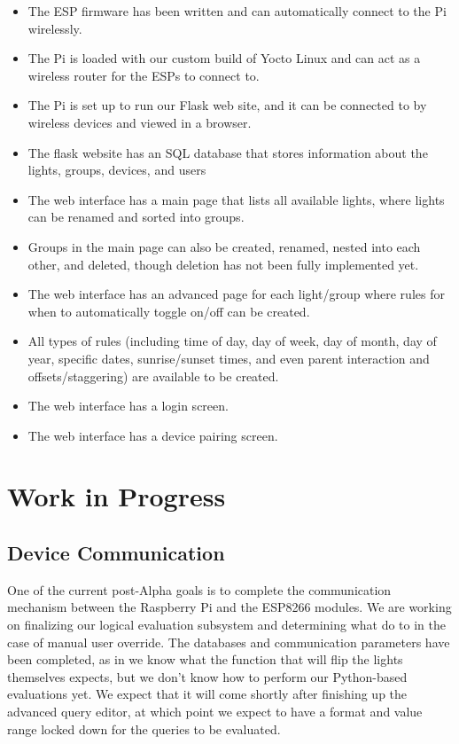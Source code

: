 \documentclass[oneside,openright]{book}
\begin{document}
\begin{itemize}
    \item The ESP firmware has been written and can automatically connect to
        the Pi wirelessly.
    \item The Pi is loaded with our custom build of Yocto Linux and can act as
        a wireless router for the ESPs to connect to.
    \item The Pi is set up to run our Flask web site, and it can be connected 
        to by wireless devices and viewed in a browser.
    \item The flask website has an SQL database that stores information about 
        the lights, groups, devices, and users
    \item The web interface has a main page that lists all available lights,
        where lights can be renamed and sorted into groups.
    \item Groups in the main page can also be created, renamed, nested into 
        each other, and deleted, though deletion has not been fully implemented yet.
    \item The web interface has an advanced page for each light/group where
        rules for when to automatically toggle on/off can be created.
    \item All types of rules (including time of day, day of week, day of month,
        day of year, specific dates, sunrise/sunset times, and even parent
        interaction and offsets/staggering) are available to be created.
    \item The web interface has a login screen.
    \item The web interface has a device pairing screen.
\end{itemize}

\section{Work in Progress}
\subsection{Device Communication}
One of the current post-Alpha goals is to complete the communication mechanism between the Raspberry Pi and the ESP8266 modules. We are working on finalizing our logical evaluation subsystem and determining what do to in the case of manual user override. The databases and communication parameters have been completed, as in we know what the function that will flip the lights themselves expects, but we don't know how to perform our Python-based evaluations yet. We expect that it will come shortly after finishing up the advanced query editor, at which point we expect to have a format and value range locked down for the queries to be evaluated.\\
\end{document}
